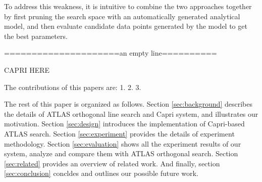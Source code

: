 \par
To address this weakness, it is intuitive to combine the two approaches together by first pruning the search
space with an automatically generated analytical model, and then evaluate candidate data points generated by the model
to get the best parameters.
\par
=====================an empty line==========
\par
CAPRI HERE

The contributions of this papers are:
1.
2.
3.

\par
The rest of this paper is organized as follows. Section \ref{sec:background} describes the details of ATLAS
orthogonal line search and Capri system, and illustrates our motivation.
Section \ref{sec:design} introduces the implementation of Capri-based ATLAS search.
Section \ref{sec:experiment} provides the details of experiment methodology.
Section \ref{sec:evaluation} shows all the experiment results of our system, analyze and compare them with ATLAS orthogonal search. 
Section \ref{sec:related} provides an overview of related work.
And finally, section \ref{sec:conclusion} concldes and outlines our possible future work.








